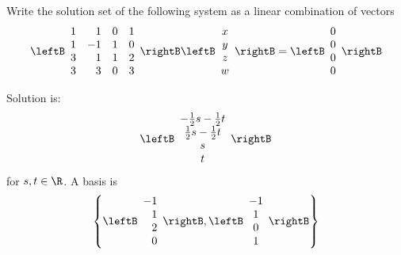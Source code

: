 \begin{enumialphparenastyle}
\begin{ex} \label{exerlineartransf8}Write the solution set of the following system as a linear combination of vectors
\begin{equation*}
\leftB
\begin{array}{rrrr}
1 & 1 & 0 & 1 \\
1 & -1 & 1 & 0 \\
3 & 1 & 1 & 2 \\
3 & 3 & 0 & 3
\end{array}
\rightB \leftB
\begin{array}{c}
x \\
y \\
z \\
w
\end{array}
\rightB =\leftB
\begin{array}{r}
0 \\
0 \\
0 \\
0
\end{array}
\rightB 
\end{equation*}
\begin{sol}
Solution is:
\[
\leftB
\begin{array}{c}
-\frac{1}{2}s-\frac{1}{2}t \\
\frac{1}{2}s-\frac{1}{2}t \\
s \\
t
\end{array}
\rightB
\]
for $s,t\in \R$. A basis is
\[
\left\{ \leftB
\begin{array}{r}
-1 \\
1 \\
2 \\
0
\end{array}
\rightB ,\leftB
\begin{array}{c}
-1 \\
1 \\
0 \\
1
\end{array}
\rightB \right\}
\]
\end{sol}
\end{ex}


\end{enumialphparenastyle}

